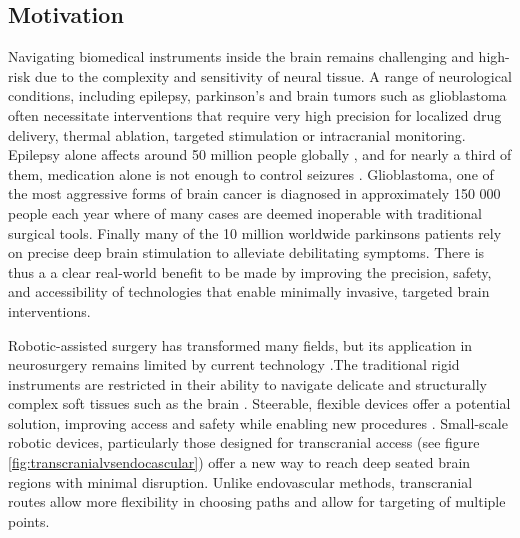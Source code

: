 



\subsection{Motivation}

Navigating biomedical instruments inside the brain remains challenging and high-risk due to the complexity and sensitivity of neural tissue. A range of neurological conditions, including epilepsy, parkinson's and brain tumors such as glioblastoma often necessitate interventions that require very high precision for localized drug delivery, thermal ablation, targeted stimulation or intracranial monitoring. Epilepsy alone affects around 50 million people globally \cite{noauthor_epilepsy_nodate}, and for nearly a third of them, medication alone is not enough to control seizures \cite{sultana_incidence_2021}. Glioblastoma, one of the most aggressive forms of brain cancer is diagnosed in approximately 150 000 people each year \cite{walsh_chapter_2016} where of many cases are deemed inoperable with traditional surgical tools. Finally many of the 10 million worldwide parkinsons patients \cite{noauthor_statistics_nodate} rely on precise deep brain stimulation to alleviate debilitating symptoms. There is thus a a clear real-world benefit to be made by improving the precision, safety, and accessibility of technologies that enable minimally invasive, targeted brain interventions.

Robotic-assisted surgery has transformed many fields, but its application in neurosurgery remains limited by current technology \cite{doulgeris_robotics_2015}.The traditional rigid instruments are restricted in their ability to navigate delicate and structurally complex soft tissues such as the brain \cite{noseda_flat_2024}. Steerable, flexible devices offer a potential solution, improving access and safety while enabling new procedures \cite{da_veiga_challenges_2020}. Small-scale robotic devices, particularly those designed for transcranial access (see figure \ref{fig:transcranialvsendocascular}) offer a new way to reach deep seated brain regions with minimal disruption. Unlike endovascular methods, transcranial routes allow more flexibility in choosing paths and allow for targeting of multiple points. 

